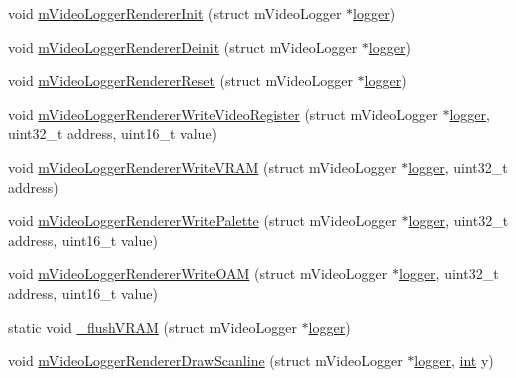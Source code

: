 \begin{DoxyCompactItemize}
\item 
void \mbox{\hyperlink{video-logger_8c_a16bd9eb225160df41ea90b332634c267}{m\+Video\+Logger\+Renderer\+Init}} (struct m\+Video\+Logger $\ast$\mbox{\hyperlink{libretro_8c_a370b093d59813e9620a3b73b831162c2}{logger}})
\item 
void \mbox{\hyperlink{video-logger_8c_ae525d818fd82d5753562673f85ff0b4d}{m\+Video\+Logger\+Renderer\+Deinit}} (struct m\+Video\+Logger $\ast$\mbox{\hyperlink{libretro_8c_a370b093d59813e9620a3b73b831162c2}{logger}})
\item 
void \mbox{\hyperlink{video-logger_8c_adeafad306d275ef128d6f88bb2c28ea0}{m\+Video\+Logger\+Renderer\+Reset}} (struct m\+Video\+Logger $\ast$\mbox{\hyperlink{libretro_8c_a370b093d59813e9620a3b73b831162c2}{logger}})
\item 
void \mbox{\hyperlink{video-logger_8c_a92cbf883be4c238b029ff28a8b905841}{m\+Video\+Logger\+Renderer\+Write\+Video\+Register}} (struct m\+Video\+Logger $\ast$\mbox{\hyperlink{libretro_8c_a370b093d59813e9620a3b73b831162c2}{logger}}, uint32\+\_\+t address, uint16\+\_\+t value)
\item 
void \mbox{\hyperlink{video-logger_8c_ad44e459bc3864018f661249901f07cf2}{m\+Video\+Logger\+Renderer\+Write\+V\+R\+AM}} (struct m\+Video\+Logger $\ast$\mbox{\hyperlink{libretro_8c_a370b093d59813e9620a3b73b831162c2}{logger}}, uint32\+\_\+t address)
\item 
void \mbox{\hyperlink{video-logger_8c_a00131ffac3e67e4c8615fe36d9aad49c}{m\+Video\+Logger\+Renderer\+Write\+Palette}} (struct m\+Video\+Logger $\ast$\mbox{\hyperlink{libretro_8c_a370b093d59813e9620a3b73b831162c2}{logger}}, uint32\+\_\+t address, uint16\+\_\+t value)
\item 
void \mbox{\hyperlink{video-logger_8c_abc3329514cd845af3704c8daabc1f626}{m\+Video\+Logger\+Renderer\+Write\+O\+AM}} (struct m\+Video\+Logger $\ast$\mbox{\hyperlink{libretro_8c_a370b093d59813e9620a3b73b831162c2}{logger}}, uint32\+\_\+t address, uint16\+\_\+t value)
\item 
static void \mbox{\hyperlink{video-logger_8c_af04fe8e7da4383d4c2de8bd267880974}{\+\_\+flush\+V\+R\+AM}} (struct m\+Video\+Logger $\ast$\mbox{\hyperlink{libretro_8c_a370b093d59813e9620a3b73b831162c2}{logger}})
\item 
void \mbox{\hyperlink{video-logger_8c_aae580067601d3fb8deb476d420acf304}{m\+Video\+Logger\+Renderer\+Draw\+Scanline}} (struct m\+Video\+Logger $\ast$\mbox{\hyperlink{libretro_8c_a370b093d59813e9620a3b73b831162c2}{logger}}, \mbox{\hyperlink{ioapi_8h_a787fa3cf048117ba7123753c1e74fcd6}{int}} y)

\end{DoxyCompactItemize}
